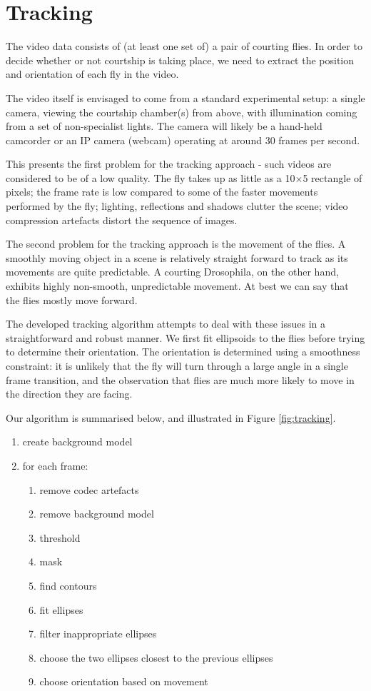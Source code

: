 \documentclass[acmtocl]{acmtrans2m}
\begin{document}
\section{Tracking}

The video data consists of (at least one set of) a pair of courting flies. In order to decide whether or not courtship is taking place, we need to extract the position and orientation of each fly in the video. 

The video itself is envisaged to come from a standard experimental setup: a single camera, viewing the courtship chamber(s) from above, with illumination coming from a set of non-specialist lights. The camera will likely be a hand-held camcorder or an IP camera (webcam) operating at around 30 frames per second. 

This presents the first problem for the tracking approach - such videos are considered to be of a low quality. The fly takes up as little as a 10$\times$5 rectangle of pixels; the frame rate is low compared to some of the faster movements performed by the fly; lighting, reflections and shadows clutter the scene; video compression artefacts distort the sequence of images. 

The second problem for the tracking approach is the movement of the flies. A smoothly moving object in a scene is relatively straight forward to track as its movements are quite predictable. A courting Drosophila, on the other hand, exhibits highly non-smooth, unpredictable movement. At best we can say that the flies mostly move forward. 

The developed tracking algorithm attempts to deal with these issues in a straightforward and robust manner. We first fit ellipsoids to the flies before trying to determine their orientation. The orientation is determined using a smoothness constraint: it is unlikely that the fly will turn through a large angle in a single frame transition, and the observation that flies are much more likely to move in the direction they are facing.

Our algorithm is summarised below, and illustrated in Figure \ref{fig:tracking}.

\begin{enumerate}
	\item create background model
	\item for each frame:
	\begin{enumerate}
		\item remove codec artefacts
		\item remove background model
		\item threshold
		\item mask
		\item find contours
		\item fit ellipses
		\item filter inappropriate ellipses
		\item choose the two ellipses closest to the previous ellipses
		\item choose orientation based on movement
	\end{enumerate}
\end{enumerate}
\end{document}
